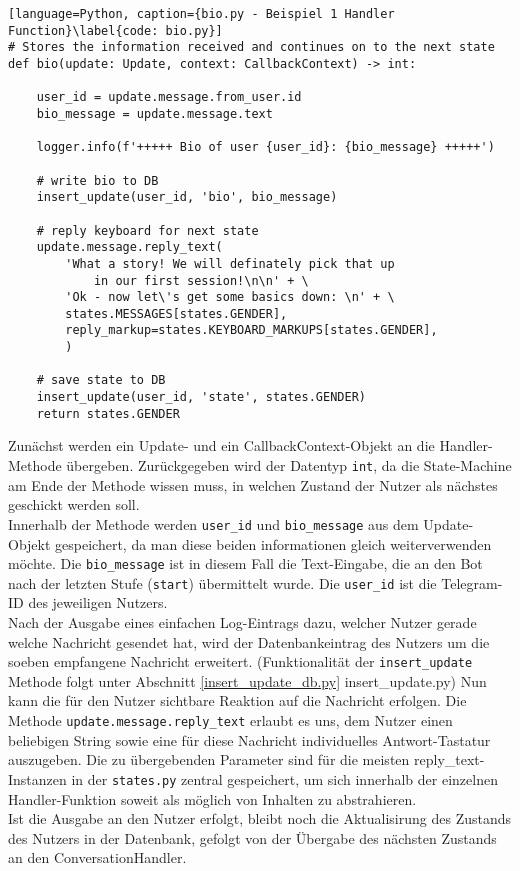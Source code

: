                 \begin{lstlisting}[language=Python, caption={bio.py - Beispiel 1 Handler Function}\label{code: bio.py}]
# Stores the information received and continues on to the next state
def bio(update: Update, context: CallbackContext) -> int:
    
    user_id = update.message.from_user.id
    bio_message = update.message.text
    
    logger.info(f'+++++ Bio of user {user_id}: {bio_message} +++++')

    # write bio to DB
    insert_update(user_id, 'bio', bio_message)

    # reply keyboard for next state
    update.message.reply_text(
        'What a story! We will definately pick that up 
            in our first session!\n\n' + \
        'Ok - now let\'s get some basics down: \n' + \
        states.MESSAGES[states.GENDER],
        reply_markup=states.KEYBOARD_MARKUPS[states.GENDER],
        )

    # save state to DB
    insert_update(user_id, 'state', states.GENDER)
    return states.GENDER
                    \end{lstlisting}

                Zunächst werden ein Update- und ein CallbackContext-Objekt an die Handler-Methode übergeben. Zurückgegeben wird der Datentyp \verb|int|, da die State-Machine am Ende der Methode wissen muss, in welchen Zustand der Nutzer als nächstes geschickt werden soll. \\
                Innerhalb der Methode werden \verb|user_id| und \verb|bio_message| aus dem Update-Objekt gespeichert, da man diese beiden informationen gleich weiterverwenden möchte. Die \verb|bio_message| ist in diesem Fall die Text-Eingabe, die an den Bot nach der letzten Stufe (\verb|start|) übermittelt wurde. Die \verb|user_id| ist die Telegram-ID des jeweiligen Nutzers. \\
                Nach der Ausgabe eines einfachen Log-Eintrags dazu, welcher Nutzer gerade welche Nachricht gesendet hat, wird der Datenbankeintrag des Nutzers um die soeben empfangene Nachricht erweitert. (Funktionalität der \verb|insert_update| Methode folgt unter Abschnitt \ref{insert_update_db.py} insert\_update.py)
                Nun kann die für den Nutzer sichtbare Reaktion auf die Nachricht erfolgen. Die Methode \verb|update.message.reply_text| erlaubt es uns, dem Nutzer einen beliebigen String sowie eine für diese Nachricht individuelles Antwort-Tastatur auszugeben. Die zu übergebenden Parameter sind für die meisten reply\_text-Instanzen in der \verb|states.py| zentral gespeichert, um sich innerhalb der einzelnen Handler-Funktion soweit als möglich von Inhalten zu abstrahieren.\\
                Ist die Ausgabe an den Nutzer erfolgt, bleibt noch die Aktualisirung des Zustands des Nutzers in der Datenbank, gefolgt von der Übergabe des nächsten Zustands an den ConversationHandler.

